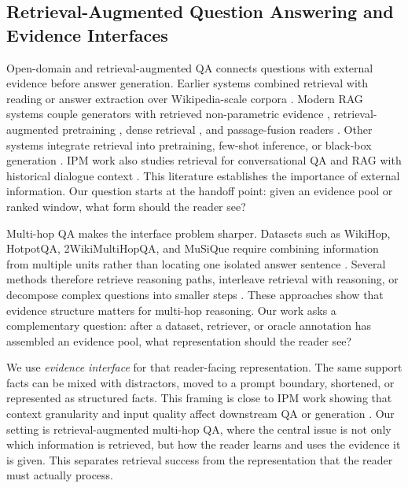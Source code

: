 \documentclass[a4paper,fleqn]{cas-sc}
\begin{document}
\subsection{Retrieval-Augmented Question Answering and Evidence Interfaces}

Open-domain and retrieval-augmented QA connects questions with external
evidence before answer generation. Earlier systems combined retrieval with
reading or answer extraction over Wikipedia-scale corpora
\citep{chen2017drqa,ryu2014wikipediaqa,noraset2021wabiqa}. Modern RAG systems
couple generators with retrieved non-parametric evidence \citep{lewis2020rag},
retrieval-augmented pretraining \citep{guu2020realm}, dense retrieval
\citep{karpukhin2020dpr}, and passage-fusion readers \citep{izacard2021fid}.
Other systems integrate retrieval into pretraining, few-shot inference, or
black-box generation \citep{borgeaud2022retro,izacard2023atlas,shi2024replug}.
IPM work also studies retrieval for conversational QA and RAG with historical
dialogue context \citep{li2023gcoqa,mo2026historicalrag}. This literature
establishes the importance of external information. Our question starts at the
handoff point: given an evidence pool or ranked window, what form should the
reader see?

Multi-hop QA makes the interface problem sharper. Datasets such as WikiHop,
HotpotQA, 2WikiMultiHopQA, and MuSiQue require combining information from
multiple units rather than locating one isolated answer sentence
\citep{welbl2018wikihop,yang2018hotpotqa,ho2020twowiki,trivedi2022musique}.
Several methods therefore retrieve reasoning paths, interleave retrieval with
reasoning, or decompose complex questions into smaller steps
\citep{asai2020reasoningpaths,trivedi2023ircot,khot2023decomposed}. These
approaches show that evidence structure matters for multi-hop reasoning. Our
work asks a complementary question: after a dataset, retriever, or oracle
annotation has assembled an evidence pool, what representation should the
reader see?

We use \emph{evidence interface} for that reader-facing representation. The
same support facts can be mixed with distractors, moved to a prompt boundary,
shortened, or represented as structured facts. This framing is close to IPM
work showing that context granularity and input quality affect downstream QA or
generation \citep{cookingcontext2025,song2026ocr}. Our setting is
retrieval-augmented multi-hop QA, where the central issue is not only which
information is retrieved, but how the reader learns and uses the evidence it is
given. This separates retrieval success from the representation that the reader
must actually process.
\end{document}
